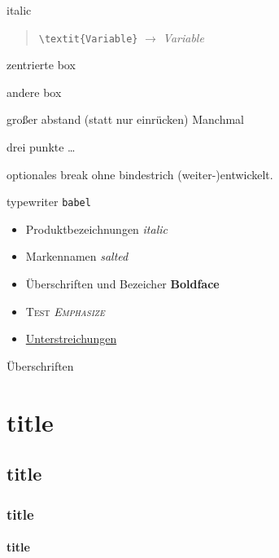 italic
\begin{quote}
\verb!\textit{Variable}! $\rightarrow$ \textit{Variable}
\end{quote}



zentrierte box
\begin{center}
\setlength{\fboxrule}{0.2mm}
\setlength{\fboxsep}{2mm}
\end{center}


andere box
\begin{center}
\end{center}






großer abstand (statt nur einrücken)
\SuperPar 
Manchmal


drei punkte
\ldots

optionales break ohne bindestrich
(weiter-){\optbreaknh}entwickelt.%

typewriter
\texttt{babel}



\begin{itemize}
\item Produktbezeichnungen \textit{italic}    %
%
\item Markennamen \textsl{salted}   %
%
\item Überschriften und Bezeicher \textbf{Boldface}   %
%
\item \textsc{Test \emph{Emphasize}}  %
%
\item \underline{Unterstreichungen} %
%
\end{itemize}


Überschriften
\chapter{title}
\section{title}
\subsection{title}
\subsubsection{title}

